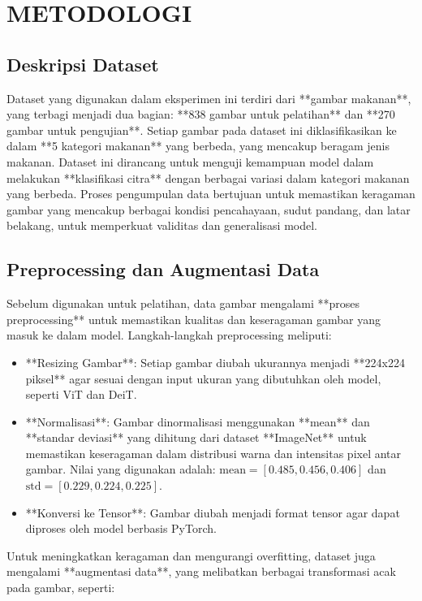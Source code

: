 \documentclass[11pt,a4paper]{article}
\begin{document}
\section{METODOLOGI}

\subsection{Deskripsi Dataset}
Dataset yang digunakan dalam eksperimen ini terdiri dari **gambar makanan**, yang terbagi menjadi dua bagian: **838 gambar untuk pelatihan** dan **270 gambar untuk pengujian**. Setiap gambar pada dataset ini diklasifikasikan ke dalam **5 kategori makanan** yang berbeda, yang mencakup beragam jenis makanan. Dataset ini dirancang untuk menguji kemampuan model dalam melakukan **klasifikasi citra** dengan berbagai variasi dalam kategori makanan yang berbeda. Proses pengumpulan data bertujuan untuk memastikan keragaman gambar yang mencakup berbagai kondisi pencahayaan, sudut pandang, dan latar belakang, untuk memperkuat validitas dan generalisasi model.

\subsection{Preprocessing dan Augmentasi Data}
Sebelum digunakan untuk pelatihan, data gambar mengalami **proses preprocessing** untuk memastikan kualitas dan keseragaman gambar yang masuk ke dalam model. Langkah-langkah preprocessing meliputi:

\begin{itemize}
    \item **Resizing Gambar**: Setiap gambar diubah ukurannya menjadi **224x224 piksel** agar sesuai dengan input ukuran yang dibutuhkan oleh model, seperti ViT dan DeiT.
    \item **Normalisasi**: Gambar dinormalisasi menggunakan **mean** dan **standar deviasi** yang dihitung dari dataset **ImageNet** untuk memastikan keseragaman dalam distribusi warna dan intensitas pixel antar gambar. Nilai yang digunakan adalah: \(\text{mean} = [0.485, 0.456, 0.406]\) dan \(\text{std} = [0.229, 0.224, 0.225]\).
    \item **Konversi ke Tensor**: Gambar diubah menjadi format tensor agar dapat diproses oleh model berbasis PyTorch.
\end{itemize}

Untuk meningkatkan keragaman dan mengurangi overfitting, dataset juga mengalami **augmentasi data**, yang melibatkan berbagai transformasi acak pada gambar, seperti:
\end{document}
